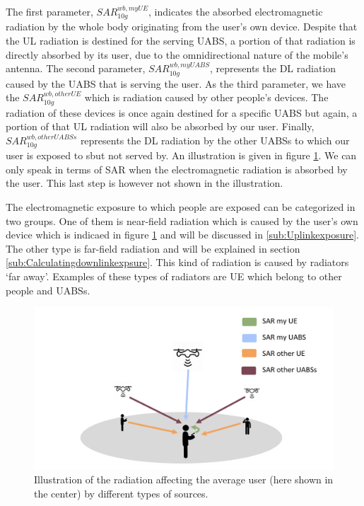 The first parameter, $SAR^{wb,myUE}_{10g}$, indicates the absorbed electromagnetic radiation by the whole body originating from the user's own device. Despite that the 
\gls{UL} radiation is destined for the serving \gls{UABS}, a portion of that radiation is directly absorbed by its user, due to the omnidirectional nature of the mobile's antenna.
The second parameter, $SAR^{wb,myUABS}_{10g}$, represents the \gls{DL} radiation caused by the \gls{UABS} that is serving the user.
As the third parameter, we have the $SAR^{wb,otherUE}_{10g}$ which is radiation caused by other people's devices. The radiation of these devices is once again 
destined for a specific \gls{UABS} but again, a portion of that \gls{UL} radiation will also be absorbed by our user.
Finally, $SAR^{wb,otherUABSs}_{10g}$ represents the \gls{DL} radiation by the other \gls{UABS}s to which our user is exposed to sbut not served by.
An illustration is given in figure \ref{fig:networkIllustration}.
We can only speak in terms of \gls{SAR}
  when the electromagnetic radiation is absorbed by the user. This last step is however not shown in the illustration.

The electromagnetic exposure to which people are exposed can be categorized in two groups. One of them is near-field radiation which is caused 
by the user's own device which is indicaed in figure \ref{fig:networkIllustration} and will be discussed in \ref{sub:Uplinkexposure}.
The other type is far-field radiation and will be explained in section \ref{sub:Calculatingdownlinkexpsure}. 
This kind of radiation is caused by radiators `far away'.
Examples of these types of radiators are \gls{UE} which belong to other people and \gls{UABS}s. 

\begin{figure}[h!]
\centering
  \includegraphics[width=\textwidth/3*2]{../images/networkIllustrationSARSources.png}
  \caption{Illustration of the radiation affecting the average user (here shown in the center) by different types of sources. }
  \label{fig:networkIllustration}
\end{figure}



